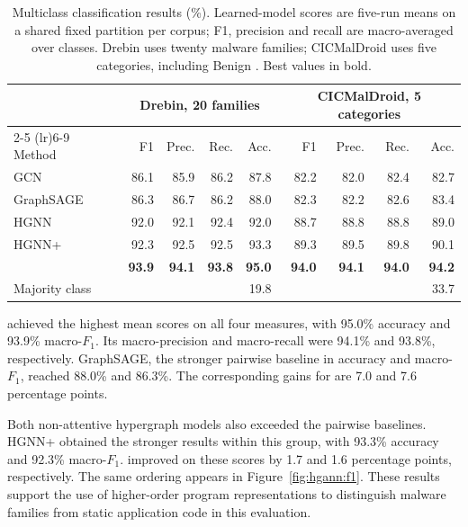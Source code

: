 \begin{table}
  \caption{Multiclass classification results (\%). Learned-model scores are five-run means
  on a shared fixed partition per corpus; F1, precision and recall are macro-averaged over classes.
  Drebin uses twenty malware families; CICMalDroid uses five categories, including Benign 
  \cite{norouzian2025hgannmal}. Best values in bold.}
  \label{tab:hgann:multi}
  \centering
  \begin{tabular}{lrrrr@{\hskip 2em}rrrr}
    \toprule
    & \multicolumn{4}{c}{Drebin, 20 families} & \multicolumn{4}{c}{CICMalDroid, 5 categories} \\
    \cmidrule(lr){2-5} \cmidrule(lr){6-9}
    Method & F1 & Prec. & Rec. & Acc. & F1 & Prec. & Rec. & Acc. \\
    \midrule
    GCN            & 86.1 & 85.9 & 86.2 & 87.8 & 82.2 & 82.0 & 82.4 & 82.7 \\
    GraphSAGE      & 86.3 & 86.7 & 86.2 & 88.0 & 82.3 & 82.2 & 82.6 & 83.4 \\
    \midrule
    HGNN           & 92.0 & 92.1 & 92.4 & 92.0 & 88.7 & 88.8 & 88.8 & 89.0 \\
    HGNN+          & 92.3 & 92.5 & 92.5 & 93.3 & 89.3 & 89.5 & 89.8 & 90.1 \\
    \hgann{}       & \textbf{93.9} & \textbf{94.1} & \textbf{93.8} & \textbf{95.0}
                   & \textbf{94.0} & \textbf{94.1} & \textbf{94.0} & \textbf{94.2} \\
    \midrule
    Majority class & & & & 19.8 & & & & 33.7 \\
    \bottomrule
  \end{tabular}
\end{table}

\hgann{} achieved the highest mean scores on all four measures, with 95.0\% accuracy and
93.9\% macro-$F_1$. Its macro-precision and macro-recall were 94.1\% and 93.8\%, respectively.
GraphSAGE, the stronger pairwise baseline in accuracy and macro-$F_1$, reached 88.0\% and
86.3\%. The corresponding gains for \hgann{} are 7.0 and 7.6 percentage points.

Both non-attentive hypergraph models also exceeded the pairwise baselines. HGNN+ obtained
the stronger results within this group, with 93.3\% accuracy and 92.3\% macro-$F_1$.
\hgann{} improved on these scores by 1.7 and 1.6 percentage points, respectively. The same
ordering appears in Figure~\ref{fig:hgann:f1}. These results support the use of higher-order
program representations to distinguish malware families from static application code in this
evaluation.

